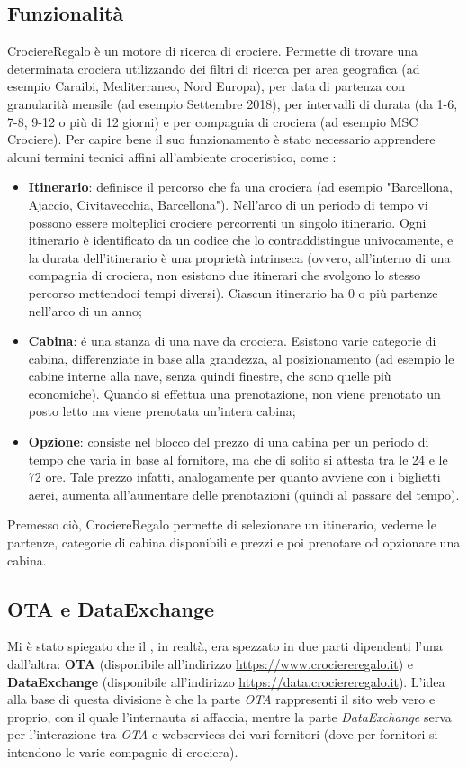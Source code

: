 \subsection{Funzionalità}
CrociereRegalo è un motore di ricerca di crociere. Permette di trovare una determinata crociera utilizzando dei filtri di ricerca per area geografica (ad esempio Caraibi, Mediterraneo, Nord Europa), per data di partenza con granularità mensile (ad esempio Settembre 2018), per intervalli di durata (da 1-6, 7-8, 9-12 o più di 12 giorni) e per compagnia di crociera (ad esempio MSC Crociere). Per capire bene il suo funzionamento è stato necessario apprendere alcuni termini tecnici affini all'ambiente croceristico, come :
\begin{itemize}
	\item \textbf{Itinerario}: definisce il percorso che fa una crociera (ad esempio "Barcellona, Ajaccio, Civitavecchia, Barcellona"). Nell'arco di un periodo di tempo vi possono essere molteplici crociere percorrenti un singolo itinerario. Ogni itinerario è identificato da un codice che lo contraddistingue univocamente, e la durata dell'itinerario è una proprietà intrinseca (ovvero, all'interno di una compagnia di crociera, non esistono due itinerari che svolgono lo stesso percorso mettendoci tempi diversi). Ciascun itinerario ha 0 o più partenze nell'arco di un anno;
	\item \textbf{Cabina}: é una stanza di una nave da crociera. Esistono varie categorie di cabina, differenziate in base alla grandezza, al posizionamento (ad esempio le cabine interne alla nave, senza quindi finestre, che sono quelle più economiche). Quando si effettua una prenotazione, non viene prenotato un posto letto ma viene prenotata un'intera cabina;
	\item \textbf{Opzione}: consiste nel blocco del prezzo di una cabina per un periodo di tempo che varia in base al fornitore, ma che di solito si attesta tra le 24 e le 72 ore. Tale prezzo infatti, analogamente per quanto avviene con i biglietti aerei, aumenta all'aumentare delle prenotazioni (quindi al passare del tempo).

\end{itemize}
Premesso ciò, CrociereRegalo permette di selezionare un itinerario, vederne le partenze, categorie di cabina disponibili e prezzi e poi prenotare od opzionare una cabina. 

\subsection{OTA e DataExchange}
Mi è stato spiegato che il \bookingEngine, in realtà, era spezzato in due parti dipendenti l'una dall'altra: \textbf{OTA} (disponibile all'indirizzo \url{https://www.crociereregalo.it}) e \textbf{DataExchange} (disponibile all'indirizzo \url{https://data.crociereregalo.it}). L'idea alla base di questa divisione è che la parte \textit{OTA} rappresenti il sito web vero e proprio, con il quale l'internauta si affaccia, mentre la parte \textit{DataExchange} serva per l'interazione tra \textit{OTA} e \glspl{webservice} dei vari fornitori (dove per fornitori si intendono le varie compagnie di crociera). 


